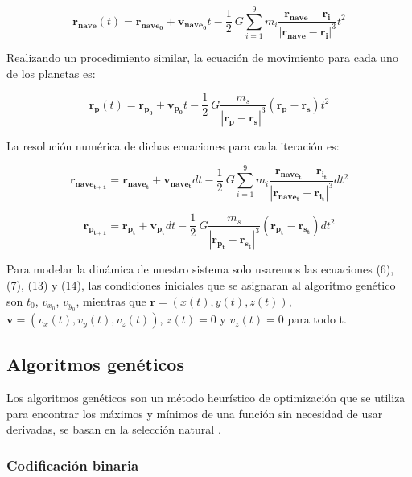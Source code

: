 \documentclass[12pt,letterpaper]{article}
\begin{document}
\begin{equation}
\mathbf{r_{nave}}(t) = \mathbf{r_{nave_0}} + \mathbf{v_{nave_0}}t - \dfrac{1}{2}\ G \sum_{i=1}^{9} m_ i\dfrac{\mathbf{r_{nave}}-\mathbf{r_i}}{|\mathbf{r_{nave}}-\mathbf{r_i}|^3} t^2
\end{equation}

Realizando un procedimiento similar, la ecuación de movimiento para cada uno de los planetas es:

\begin{equation}
\mathbf{r_{p}}(t) = \mathbf{r_{p_0}} + \mathbf{v_{p_0}}t - \dfrac{1}{2}\ G\dfrac{m_s}{|\mathbf{r_{p}}-\mathbf{r_s}|^3}(\mathbf{r_{p}}-\mathbf{r_s}) t^2
\end{equation}

La resolución numérica de dichas ecuaciones para cada iteración es:

\begin{equation}
\mathbf{r_{nave_{t+1}}} = \mathbf{r_{nave_t}} + \mathbf{v_{nave_t}}dt - \dfrac{1}{2}\ G \sum_{i=1}^{9} m_ {i}\dfrac{\mathbf{r_{nave_t}}-\mathbf{r_{i_t}}}{|\mathbf{r_{nave_t}}-\mathbf{r_{i_t}}|^3} dt^2
\end{equation}

\begin{equation}
\mathbf{r_{p_{t+1}}} = \mathbf{r_{p_t}} + \mathbf{v_{p_t}}dt - \dfrac{1}{2}\ G\dfrac{m_s}{|\mathbf{r_{p_t}}-\mathbf{r_{s_t}}|^3}(\mathbf{r_{p_t}}-\mathbf{r_{s_t}}) dt^2
\end{equation}

Para modelar la dinámica de nuestro sistema solo usaremos las ecuaciones (6), (7), (13) y (14), las condiciones iniciales que se asignaran al algoritmo genético son $t_0$, $v_{x_0}$, $v_{y_0}$, mientras que $\mathbf{r}=(x(t),y(t),z(t))$, $\mathbf{v}=(v_x(t),v_y(t),v_z(t))$, $z(t)=0$ y $v_z(t)=0$ para todo t.

\subsection*{Algoritmos genéticos}

Los algoritmos genéticos son un método heurístico de optimización que se utiliza para encontrar los máximos y mínimos de una función sin necesidad de usar derivadas, se basan en la selección natural \citep{gestal2010introduccion}.

\subsubsection*{Codificación binaria}
\end{document}
